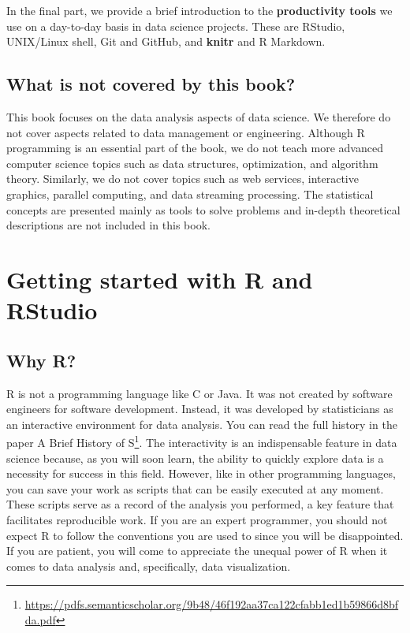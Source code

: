 \documentclass[
]{krantz}
\begin{document}
In the final part, we provide a brief introduction to the \textbf{productivity tools} we use on a day-to-day basis in data science projects. These are RStudio, UNIX/Linux shell, Git and GitHub, and \textbf{knitr} and R Markdown.

\hypertarget{what-is-not-covered-by-this-book}{%
\section*{What is not covered by this book?}\label{what-is-not-covered-by-this-book}}


This book focuses on the data analysis aspects of data science. We therefore do not cover aspects related to data management or engineering. Although R programming is an essential part of the book, we do not teach more advanced computer science topics such as data structures, optimization, and algorithm theory. Similarly, we do not cover topics such as web services, interactive graphics, parallel computing, and data streaming processing. The statistical concepts are presented mainly as tools to solve problems and in-depth theoretical descriptions are not included in this book.

\hypertarget{getting-started}{%
\chapter{Getting started with R and RStudio}\label{getting-started}}

\hypertarget{why-r}{%
\section{Why R?}\label{why-r}}

R is not a programming language like C or Java. It was not created by software engineers for software development. Instead, it was developed by statisticians as an interactive environment for data analysis. You can read the full history in the paper A Brief History of S\footnote{\url{https://pdfs.semanticscholar.org/9b48/46f192aa37ca122cfabb1ed1b59866d8bfda.pdf}}. The interactivity is an indispensable feature in data science because, as you will soon learn, the ability to quickly explore data is a necessity for success in this field. However, like in other programming languages, you can save your work as scripts that can be easily executed at any moment. These scripts serve as a record of the analysis you performed, a key feature that facilitates reproducible work. If you are an expert programmer, you should not expect R to follow the conventions you are used to since you will be disappointed. If you are patient, you will come to appreciate the unequal power of R when it comes to data analysis and, specifically, data visualization.
\end{document}

